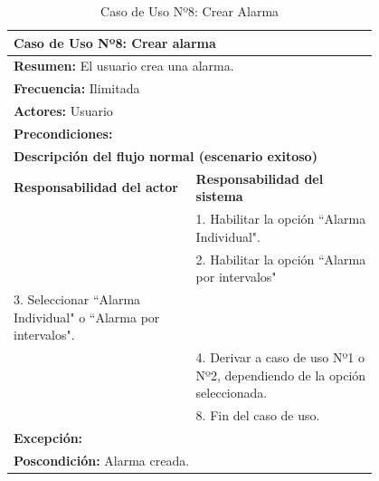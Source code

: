 \begin{table}[H]
    \centering
    \caption{Caso de Uso Nº8: Crear Alarma}
    \vspace{10pt}
    
    \begin{tabular}{| p{0.4\linewidth} | p{0.4\linewidth} |}
        \hline
        \multicolumn{2}{|l|}{\textbf{Caso de Uso Nº8:} Crear alarma} \\
        \hline
        \multicolumn{2}{|l|}{\textbf{Resumen:} El usuario crea una alarma.} \\
        \hline
        \multicolumn{2}{|l|}{\textbf{Frecuencia:} Ilimitada} \\
        \hline
        \multicolumn{2}{|l|}{\textbf{Actores:} Usuario} \\
        \hline
        \multicolumn{2}{|p{0.8\linewidth}|}{\textbf{Precondiciones:} } \\
        \hline
        \multicolumn{2}{|l|}{\textbf{Descripción del flujo normal (escenario exitoso)} } \\
        \hline
        \textbf{Responsabilidad del actor} & \textbf{Responsabilidad del sistema} \\
        & 1. Habilitar la opción ``Alarma Individual".\\
        & 2. Habilitar la opción ``Alarma por intervalos"\\
        3. Seleccionar ``Alarma Individual" o ``Alarma por intervalos". &\\
        & 4. Derivar a caso de uso Nº1 o Nº2, dependiendo de la opción seleccionada.\\
        & 8. Fin del caso de uso. \\
        \hline
        \multicolumn{2}{|p{0.8\linewidth}|}{\textbf{Excepción:}}\\
        \hline
        \multicolumn{2}{|l|}{\textbf{Poscondición:} Alarma creada.} \\
        \hline
    \end{tabular}

    \label{table:8}
\end{table}

